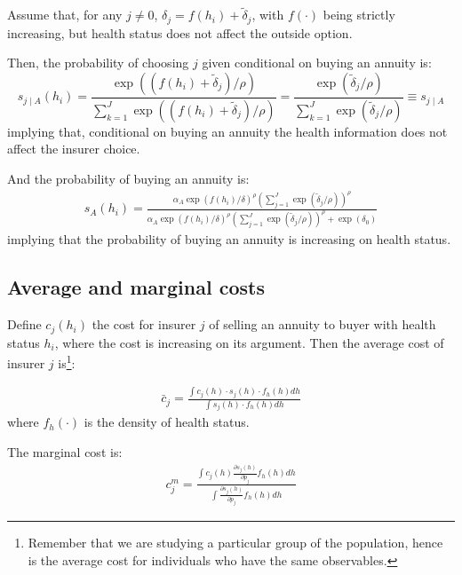 \documentclass[12pt]{article}
\theoremstyle{plain}
\theoremstyle{plain}
\begin{document}
Assume that, for any $j\neq 0$,  $\delta_j = f(h_i) + \tilde{\delta}_j$, with $f(\cdot)$ being strictly increasing,  but health status does not affect the outside option. 


Then, the probability of choosing $j$ given conditional on buying an annuity is: 
\begin{equation}\label{eq:no_selection}
    s_{j\mid A}(h_i) = \frac{\exp((f(h_i) + \tilde{\delta}_j) / \rho)}{\sum_{k=1}^{J} \exp((f(h_i) + \tilde{\delta}_j)/ \rho)} = \frac{\exp( \tilde{\delta}_j / \rho)}{\sum_{k=1}^{J} \exp( \tilde{\delta}_j/ \rho)} \equiv s_{j\mid A}
\end{equation}
implying that, conditional on buying an annuity the health information does not affect the insurer choice. 
 

And the probability of buying an annuity is: 
\begin{align}\label{eq:into_selection}
    s_A(h_i)
    = \frac{\alpha_A\exp(f(h_i)/\delta)^\rho\left(\sum_{j=1}^J \exp(\tilde{\delta}_j/\rho)\right)^\rho }{\alpha_A\exp(f(h_i)/\delta)^\rho\left(\sum_{j=1}^J \exp(\tilde{\delta}_j/\rho)\right)^\rho  +  \exp \left(\delta_0 \right)}
\end{align}
implying that the probability of buying an annuity is increasing on health status. 


\subsection{Average and marginal costs}\label{sec:costs}

Define $c_j(h_i)$ the cost for insurer $j$ of selling an annuity to buyer with health status $h_i$, where the cost is increasing on its argument.  Then the average cost of insurer $j$ is\footnote{Remember that we are studying a particular group of the population, hence is the average cost for individuals who have the same observables. }: 

\begin{align}\label{eq:avg_cost}
    \bar{c}_j = \frac{\int c_j(h)\cdot s_j(h) \cdot f_h(h) dh}{\int  s_j(h) \cdot f_h(h) dh}
\end{align}
where $f_h(\cdot)$ is the density of health status. 

The marginal cost is: 
\begin{align}\label{eq:mg_cost}
    c^m_j = \frac{\int c_j(h) \frac{\partial s_j(h)}{\partial p_j}  f_h(h) dh }{\int \frac{\partial s_j(h)}{\partial p_j}  f_h(h) dh }
\end{align}
\end{document}
